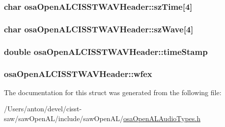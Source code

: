 \subsubsection[{sz\+Time}]{\setlength{\rightskip}{0pt plus 5cm}char osa\+Open\+A\+L\+C\+I\+S\+S\+T\+W\+A\+V\+Header\+::sz\+Time\mbox{[}4\mbox{]}}\label{structosa_open_a_l_c_i_s_s_t_w_a_v_header_abf840e99890224e4da192546e1bf8211}
\hypertarget{structosa_open_a_l_c_i_s_s_t_w_a_v_header_a02f2c36a22eb4d9724059cca34cedb29}{}
\subsubsection[{sz\+Wave}]{\setlength{\rightskip}{0pt plus 5cm}char osa\+Open\+A\+L\+C\+I\+S\+S\+T\+W\+A\+V\+Header\+::sz\+Wave\mbox{[}4\mbox{]}}\label{structosa_open_a_l_c_i_s_s_t_w_a_v_header_a02f2c36a22eb4d9724059cca34cedb29}
\hypertarget{structosa_open_a_l_c_i_s_s_t_w_a_v_header_a50e8ee3dcdfa333af1b637b6e4780924}{}
\subsubsection[{time\+Stamp}]{\setlength{\rightskip}{0pt plus 5cm}double osa\+Open\+A\+L\+C\+I\+S\+S\+T\+W\+A\+V\+Header\+::time\+Stamp}\label{structosa_open_a_l_c_i_s_s_t_w_a_v_header_a50e8ee3dcdfa333af1b637b6e4780924}
\hypertarget{structosa_open_a_l_c_i_s_s_t_w_a_v_header_a71f0f631b8d9cb27ef7aea0bc072e170}{}
\subsubsection[{wfex}]{ osa\+Open\+A\+L\+C\+I\+S\+S\+T\+W\+A\+V\+Header\+::wfex}\label{structosa_open_a_l_c_i_s_s_t_w_a_v_header_a71f0f631b8d9cb27ef7aea0bc072e170}


The documentation for this struct was generated from the following file\+:\begin{DoxyCompactItemize}
\item 
/\+Users/anton/devel/cisst-\/saw/saw\+Open\+A\+L/include/saw\+Open\+A\+L/\hyperlink{osa_open_a_l_audio_types_8h}{osa\+Open\+A\+L\+Audio\+Types.\+h}\end{DoxyCompactItemize}
